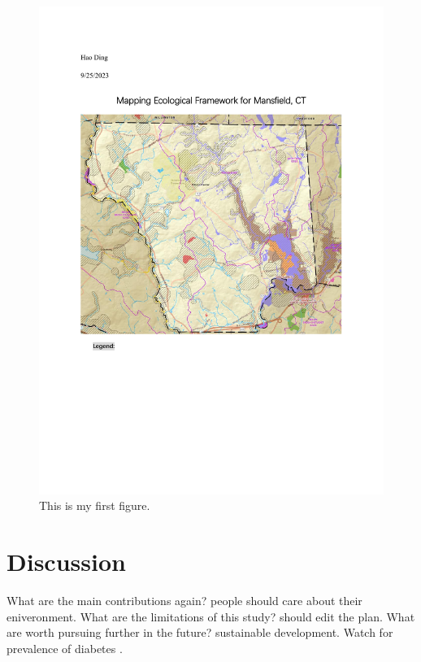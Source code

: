 \documentclass[12pt]{article}
\begin{document}
\begin{figure}[tbp]
  \centering
  \includegraphics[width=\textwidth]{project.pdf}
  \caption{This is my first figure.}
  \label{fig:cars}
\end{figure}

\section{Discussion}
\label{sec:disc}

What are the main contributions again?
people should care about their eniveronment. 
What are the limitations of this study?
should edit the plan. 
What are worth pursuing further in the future?
sustainable development. 
\lipsum[1-2]
Watch for prevalence of diabetes \citep{dongarra1987computer}.



\end{document}
